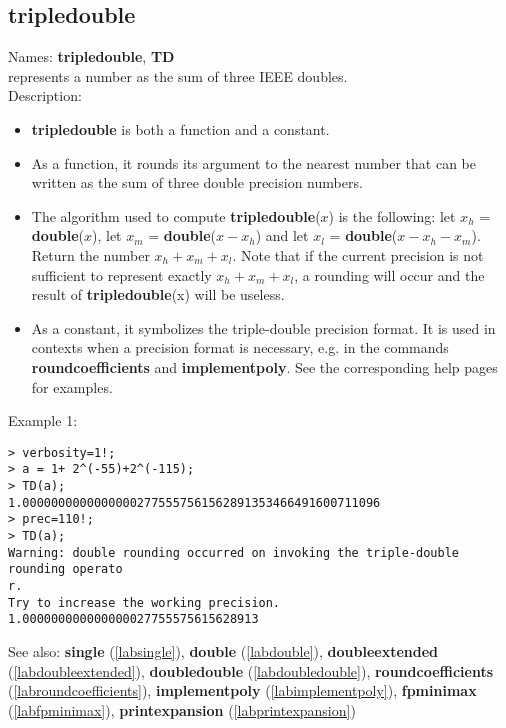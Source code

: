 \subsection{tripledouble}
\label{labtripledouble}
\noindent Names: \textbf{tripledouble}, \textbf{TD}\\
represents a number as the sum of three IEEE doubles.\\
\noindent Description: \begin{itemize}

\item \textbf{tripledouble} is both a function and a constant.

\item As a function, it rounds its argument to the nearest number that can be written
   as the sum of three double precision numbers.

\item The algorithm used to compute \textbf{tripledouble}($x$) is the following: let $x_h$ = \textbf{double}($x$),
   let $x_m$ = \textbf{double}($x-x_h$) and let $x_l$ = \textbf{double}($x-x_h-x_m$). 
   Return the number $x_h+x_m+x_l$. Note that if the
   current precision is not sufficient to represent exactly $x_h+x_m+x_l$, a rounding will
   occur and the result of \textbf{tripledouble}(x) will be useless.

\item As a constant, it symbolizes the triple-double precision format. It is used in 
   contexts when a precision format is necessary, e.g. in the commands 
   \textbf{roundcoefficients} and \textbf{implementpoly}.
   See the corresponding help pages for examples.
\end{itemize}
\noindent Example 1: 
\begin{center}\begin{minipage}{15cm}\begin{Verbatim}[frame=single]
> verbosity=1!;
> a = 1+ 2^(-55)+2^(-115);
> TD(a);
1.00000000000000002775557561562891353466491600711096
> prec=110!;
> TD(a);
Warning: double rounding occurred on invoking the triple-double rounding operato
r.
Try to increase the working precision.
1.000000000000000027755575615628913
\end{Verbatim}
\end{minipage}\end{center}
See also: \textbf{single} (\ref{labsingle}), \textbf{double} (\ref{labdouble}), \textbf{doubleextended} (\ref{labdoubleextended}), \textbf{doubledouble} (\ref{labdoubledouble}), \textbf{roundcoefficients} (\ref{labroundcoefficients}), \textbf{implementpoly} (\ref{labimplementpoly}), \textbf{fpminimax} (\ref{labfpminimax}), \textbf{printexpansion} (\ref{labprintexpansion})
